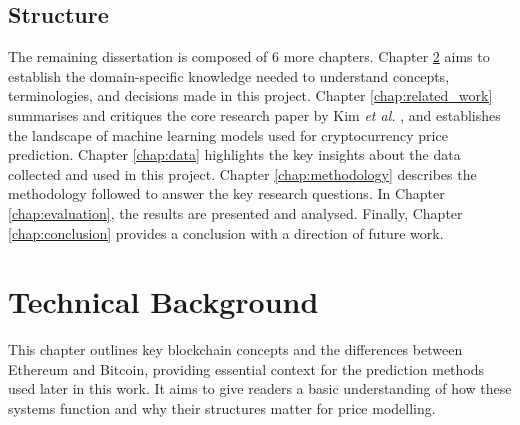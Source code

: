 \documentclass[ %
                    author={Raj Dhakan},
                supervisor={Dr. Ayush Joshi},
                    degree={MSc},
                     title={Ethereum Price Prediction using Internal and External Factors},
                  subtitle={},
                      type={},
                      year={2025}]{dissertation}
\begin{document}
\section{Structure}
The remaining dissertation is composed of 6 more chapters. Chapter \ref{chap:background} aims to establish the domain-specific knowledge needed to understand concepts, terminologies, and decisions made in this project. Chapter \ref{chap:related_work} summarises and critiques the core research paper by Kim \textit{et al.} \cite{RN141}, and establishes the landscape of machine learning models used for cryptocurrency price prediction. Chapter \ref{chap:data} highlights the key insights about the data collected and used in this project. Chapter \ref{chap:methodology} describes the methodology followed to answer the key research questions. In Chapter \ref{chap:evaluation}, the results are presented and analysed. Finally, Chapter \ref{chap:conclusion} provides a conclusion with a direction of future work. 

\chapter{Technical Background}
\label{chap:background}
This chapter outlines key blockchain concepts and the differences between Ethereum and Bitcoin, providing essential context for the prediction methods used later in this work. It aims to give readers a basic understanding of how these systems function and why their structures matter for price modelling.
\end{document}
